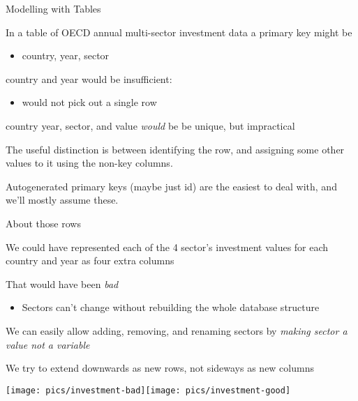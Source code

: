 \documentclass{hertieteaching}
\begin{document}
\begin{frame}{Modelling with Tables}
  
In a table of OECD annual multi-sector investment data
a primary key might be 
\begin{itemize}
  \item \textsf{country}, \textsf{year}, \textsf{sector}
\end{itemize}
\textsf{country} and \textsf{year} would be insufficient:
\begin{itemize}
  \item would not pick out a single row 
\end{itemize}
\textsf{country} \textsf{year}, \textsf{sector}, and \textsf{value} \textit{would} be be unique, but impractical

The useful distinction is between identifying the row, and assigning some other values to it using the non-key columns.

Autogenerated primary keys (maybe just \textsf{id}) are the easiest to deal with, and we'll mostly assume these.

\end{frame}

\begin{frame}{About those rows}

We could have represented each of the 4 sector's investment values for each country and year as four extra columns

That would have been \textit{bad}
\begin{itemize}
  \item Sectors can't change without rebuilding the whole database structure
\end{itemize}
We can easily allow adding, removing, and renaming sectors by \textit{making sector a value not a variable}

We try to extend downwards as new rows, not sideways as 
new columns

\centerline{\texttt{[image: pics/investment-bad]}\hspace{2em}\texttt{[image: pics/investment-good]}}

\end{frame}
\end{document}
